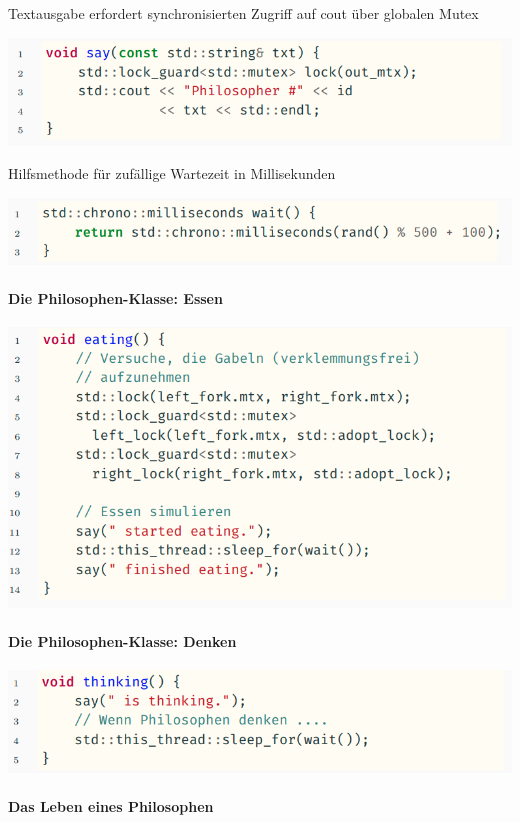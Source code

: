 \documentclass[10pt]{article}
\begin{document}
  Textausgabe erfordert synchronisierten Zugriff auf cout über globalen Mutex
  \begin{center}
    \includegraphics[width=0.4\linewidth]{Assets/Programmierparadigmen-code-snippet-27}
  \end{center}

  Hilfsmethode für zufällige Wartezeit in Millisekunden
  \begin{center}
    \includegraphics[width=0.4\linewidth]{Assets/Programmierparadigmen-code-snippet-28}
  \end{center}
  
  \paragraph{Die Philosophen-Klasse: Essen}
  
  \begin{center}
    \includegraphics[width=0.4\linewidth]{Assets/Programmierparadigmen-code-snippet-29}
  \end{center}
  
  \paragraph{Die Philosophen-Klasse: Denken}
  
  \begin{center}
    \includegraphics[width=0.4\linewidth]{Assets/Programmierparadigmen-code-snippet-30}
  \end{center}
  
  \paragraph{Das Leben eines Philosophen}
  
\end{document}
